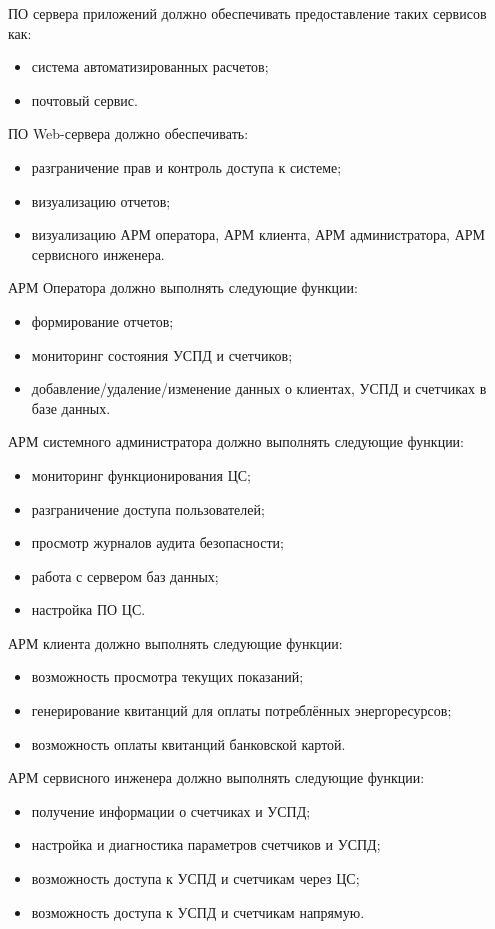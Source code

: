 ПО сервера приложений должно обеспечивать предоставление таких сервисов как:
\begin{itemize}
 \item система автоматизированных расчетов;
 \item почтовый сервис.
\end{itemize}

ПО Web-сервера должно обеспечивать:
\begin{itemize}
 \item разграничение прав и контроль доступа к системе;
 \item визуализацию отчетов;
 \item визуализацию АРМ оператора, АРМ клиента, АРМ администратора, АРМ сервисного инженера.
\end{itemize}

АРМ Оператора должно выполнять следующие функции:
\begin{itemize}
 \item формирование отчетов;
 \item мониторинг состояния УСПД и счетчиков;
 \item добавление/удаление/изменение данных о клиентах, УСПД и счетчиках в базе данных.
\end{itemize}

АРМ системного администратора должно выполнять следующие функции:
\begin{itemize}
 \item мониторинг функционирования ЦС;
 \item разграничение доступа пользователей;
 \item просмотр журналов аудита безопасности;
 \item работа с сервером баз данных;
 \item настройка ПО ЦС.
\end{itemize}

АРМ клиента должно выполнять следующие функции:
\begin{itemize}
 \item возможность просмотра текущих показаний;
 \item генерирование квитанций для оплаты потреблённых энергоресурсов;
 \item возможность оплаты квитанций банковской картой.
\end{itemize}

АРМ сервисного инженера должно выполнять следующие функции:
\begin{itemize}
 \item получение информации о счетчиках и УСПД;
 \item настройка и диагностика параметров счетчиков и УСПД;
 \item возможность доступа к УСПД и счетчикам через ЦС;
 \item возможность доступа к УСПД и счетчикам напрямую.
\end{itemize}

